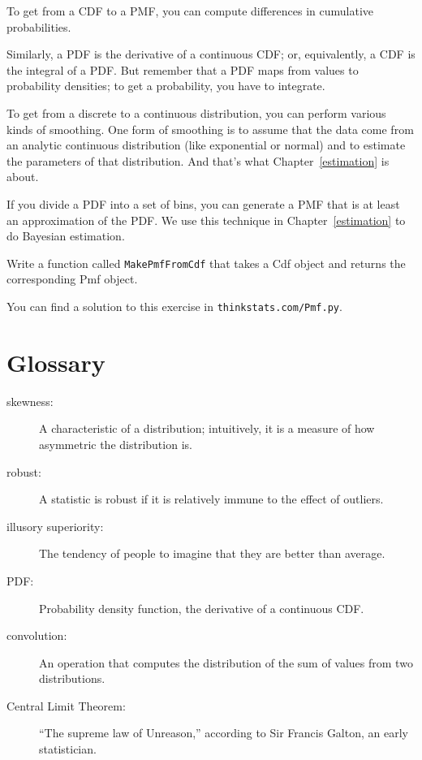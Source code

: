\documentclass[12pt]{book}
\begin{document}
To get from a CDF to a PMF, you can compute differences in cumulative
probabilities.

Similarly, a PDF is the derivative of a continuous CDF; or, equivalently,
a CDF is the integral of a PDF.  But remember that a PDF maps from
values to probability densities; to get a probability, you have to
integrate.

To get from a discrete to a continuous distribution, you can perform
various kinds of smoothing.  One form of smoothing is to assume that
the data come from an analytic continuous distribution
(like exponential or normal) and to estimate the parameters of that
distribution.  And that's what Chapter~\ref{estimation} is about.

If you divide a PDF into a set of bins, you can generate a PMF that is
at least an approximation of the PDF.  We use this
technique in Chapter~\ref{estimation} to do Bayesian estimation.

\begin{ex}

Write a function called {\tt MakePmfFromCdf} that takes a Cdf object
and returns the corresponding Pmf object.

You can find a solution to this exercise in {\tt thinkstats.com/Pmf.py}.

\end{ex}

\section{Glossary}

\begin{description}

\item[skewness:] A characteristic of a distribution; intuitively, it
is a measure of how asymmetric the distribution is.

\item[robust:] A statistic is robust if it is relatively immune to the
  effect of outliers.

\item[illusory superiority:] The tendency of people to imagine that
they are better than average.

\item[PDF:] Probability density function, the derivative of a continuous CDF.

\item[convolution:] An operation that computes the distribution of the
sum of values from two distributions. 



\item[Central Limit Theorem:] ``The supreme law of Unreason,'' according
to Sir Francis Galton, an early statistician.

\end{description}
\end{document}

